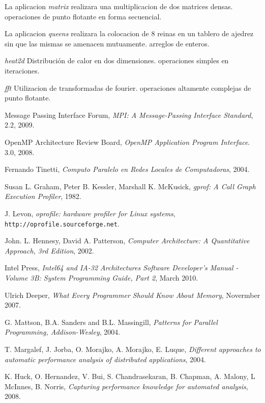 \documentclass[a4paper,twocolumn]{article}
\begin{document}
La aplicacion \emph{matrix} realizara una multiplicacion de dos matrices densas.
operaciones de punto flotante en forma secuencial.

La aplicacion \emph{queens} realizara la colocacion de 8 reinas en un tablero de ajedrez sin que las mismas se amenacen mutuamente.
arreglos de enteros.

\emph{heat2d} Distribuci\'on de calor en dos dimensiones.
operaciones simples en iteraciones.

\emph{fft} Utilizacion de transformadas de fourier.
operaciones altamente complejas de punto flotante.

\begin{thebibliography}{9}
  
  Message Passing Interface Forum,
  \emph{MPI: A Message-Passing Interface Standard},
  2.2,
  2009.

  OpenMP Architecture Review Board,
  \emph{OpenMP Application Program Interface}.
  3.0,
  2008.

  Fernando Tinetti,
  \emph{Computo Paralelo en Redes Locales de Computadoras},
  2004.

 Susan L. Graham,  Peter B. Kessler,  Marshall K. McKusick,
 \emph{gprof: A Call Graph Execution Profiler},
 1982.

J. Levon,
\emph{oprofile: hardware profiler for Linux systems},
{\tt http://oprofile.sourceforge.net}.

 John. L. Hennesy, David A. Patterson,
 \emph{Computer Architecture: A Quantitative Approach, 3rd Edition},
 2002.

 Intel Press,
 \emph{Intel64 and IA-32 Architectures Software Developer's Manual - Volume 3B: System Programming Guide, Part 2},
 March 2010.

 Ulrich Deeper,
 \emph{What Every Programmer Should Know About Memory},
 Novermber 2007.

 G. Mattson, B.A. Sanders and B.L. Massingill, 
 \emph{Patterns for Parallel Programming, Addison-Wesley},
 2004.

 T. Margalef, J. Jorba, O. Morajko, A. Morajko, E. Luque,
 \emph{Different approaches to automatic performance analysis of distributed applications},
 2004.

 K. Huck, O. Hernandez, V. Bui, S. Chandrasekaran, B. Chapman, A. Malony, L McInnes, B. Norris,
 \emph{Capturing performance knowledge for automated analysis},
 2008.


\end{thebibliography}
\end{document}
